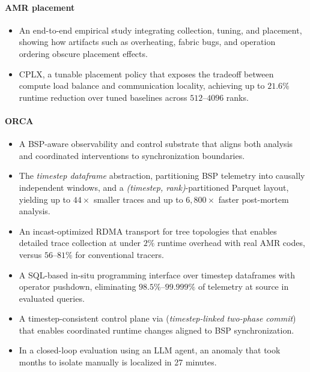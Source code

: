 \paragraph{AMR placement}
\begin{itemize}
  \item An end-to-end empirical study integrating collection, tuning, and placement, showing how
        artifacts such as overheating, fabric bugs, and operation ordering obscure placement effects.

  \item CPLX, a tunable placement policy that exposes the tradeoff between compute load balance and
        communication locality, achieving up to $21.6\%$ runtime reduction over tuned baselines across
        $512$--$4096$ ranks.
\end{itemize}

\paragraph{ORCA}
\begin{itemize}
  \item A BSP-aware observability and control substrate that aligns both analysis and coordinated
        interventions to synchronization boundaries.

  \item The \emph{timestep dataframe} abstraction, partitioning BSP telemetry into causally
        independent windows,
        and a \emph{(timestep, rank)}-partitioned
        Parquet layout, yielding up to $44\times$
        smaller traces and up to $6{,}800\times$ faster post-mortem analysis.

  \item An incast-optimized RDMA transport for tree topologies that enables detailed trace collection
        at under $2\%$ runtime overhead with real AMR codes, versus $56$--$81\%$ for conventional tracers.

  \item A SQL-based in-situ programming interface over timestep dataframes with operator pushdown,
        eliminating $98.5\%$--$99.999\%$ of telemetry
        at source in evaluated queries.

  \item A timestep-consistent control plane via \twopc{} (\emph{timestep-linked two-phase commit}) that
        enables coordinated runtime changes aligned to BSP synchronization.

  \item In a closed-loop evaluation using an LLM agent, an anomaly that took months to isolate
        manually is localized in 27 minutes.
\end{itemize}


